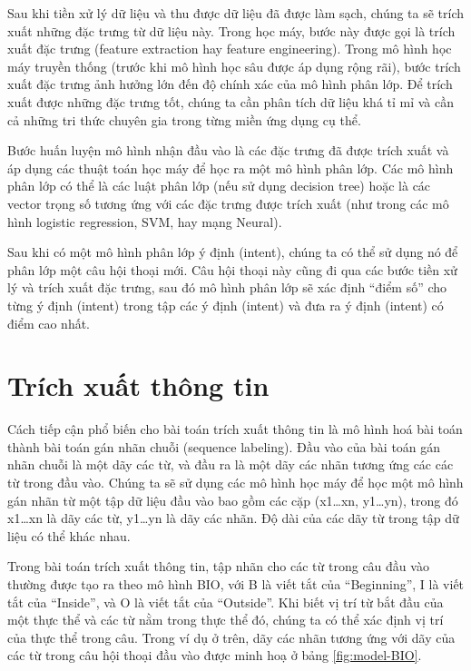 Sau khi tiền xử lý dữ liệu và thu được dữ liệu đã được làm sạch, chúng ta sẽ trích xuất những đặc trưng từ dữ liệu này. Trong học máy, bước này được gọi là trích xuất đặc trưng (feature extraction hay feature engineering). Trong mô hình học máy truyền thống (trước khi mô hình học sâu được áp dụng rộng rãi), bước trích xuất đặc trưng ảnh hưởng lớn đến độ chính xác của mô hình phân lớp. Để trích xuất được những đặc trưng tốt, chúng ta cần phân tích dữ liệu khá tỉ mỉ và cần cả những tri thức chuyên gia trong từng miền ứng dụng cụ thể.

Bước huấn luyện mô hình nhận đầu vào là các đặc trưng đã được trích xuất và áp dụng các thuật toán học máy để học ra một mô hình phân lớp. Các mô hình phân lớp có thể là các luật phân lớp (nếu sử dụng decision tree) hoặc là các vector trọng số tương ứng với các đặc trưng được trích xuất (như trong các mô hình logistic regression, SVM, hay mạng Neural).

Sau khi có một mô hình phân lớp ý định (intent), chúng ta có thể sử dụng nó để phân lớp một câu hội thoại mới. Câu hội thoại này cũng đi qua các bước tiền xử lý và trích xuất đặc trưng, sau đó mô hình phân lớp sẽ xác định “điểm số” cho từng ý định (intent) trong tập các ý định (intent) và đưa ra ý định (intent) có điểm cao nhất.

\section{Trích xuất thông tin}

Cách tiếp cận phổ biến cho bài toán trích xuất thông tin là mô hình hoá bài toán thành bài toán gán nhãn chuỗi (sequence labeling). Đầu vào của bài toán gán nhãn chuỗi là một dãy các từ, và đầu ra là một dãy các nhãn tương ứng các các từ trong đầu vào. Chúng ta sẽ sử dụng các mô hình học máy để học một mô hình gán nhãn từ một tập dữ liệu đầu vào bao gồm các cặp (x1…xn, y1…yn), trong đó x1…xn là dãy các từ, y1…yn là dãy các nhãn. Độ dài của các dãy từ trong tập dữ liệu có thể khác nhau.

Trong bài toán trích xuất thông tin, tập nhãn cho các từ trong câu đầu vào thường được tạo ra theo  mô hình BIO, với B là viết tắt của “Beginning”, I là viết tắt của “Inside”, và O là viết tắt của “Outside”. Khi biết vị trí từ bắt đầu của một thực thể và các từ nằm trong thực thể đó, chúng ta có thể xác định vị trí của thực thể trong câu. Trong ví dụ ở trên, dãy các nhãn tương ứng với dãy của các từ trong câu hội thoại đầu vào được minh hoạ ở bảng \ref{fig:model-BIO}.



